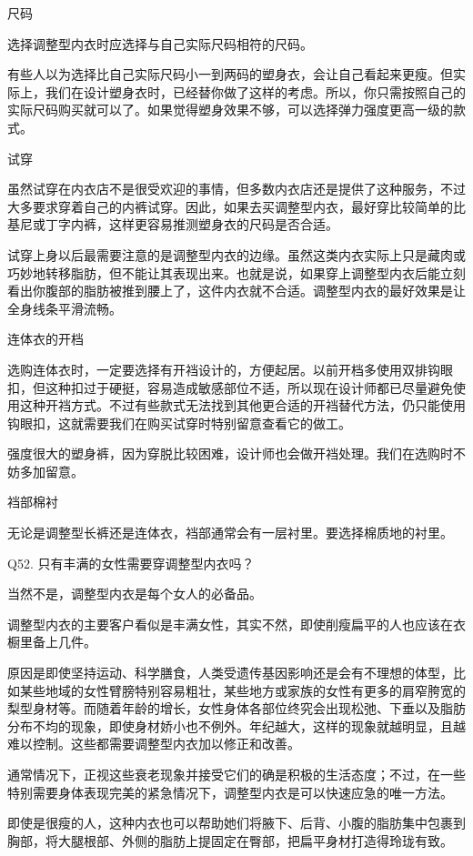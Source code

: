 \documentclass[12pt,UTF8]{ctexbook}
\begin{document}
尺码

选择调整型内衣时应选择与自己实际尺码相符的尺码。

有些人以为选择比自己实际尺码小一到两码的塑身衣，会让自己看起来更瘦。但实际上，我们在设计塑身衣时，已经替你做了这样的考虑。所以，你只需按照自己的实际尺码购买就可以了。如果觉得塑身效果不够，可以选择弹力强度更高一级的款式。

试穿

虽然试穿在内衣店不是很受欢迎的事情，但多数内衣店还是提供了这种服务，不过大多要求穿着自己的内裤试穿。因此，如果去买调整型内衣，最好穿比较简单的比基尼或丁字内裤，这样更容易推测塑身衣的尺码是否合适。

试穿上身以后最需要注意的是调整型内衣的边缘。虽然这类内衣实际上只是藏肉或巧妙地转移脂肪，但不能让其表现出来。也就是说，如果穿上调整型内衣后能立刻看出你腹部的脂肪被推到腰上了，这件内衣就不合适。调整型内衣的最好效果是让全身线条平滑流畅。

连体衣的开档

选购连体衣时，一定要选择有开裆设计的，方便起居。以前开档多使用双排钩眼扣，但这种扣过于硬挺，容易造成敏感部位不适，所以现在设计师都已尽量避免使用这种开裆方式。不过有些款式无法找到其他更合适的开裆替代方法，仍只能使用钩眼扣，这就需要我们在购买试穿时特别留意查看它的做工。

强度很大的塑身裤，因为穿脱比较困难，设计师也会做开裆处理。我们在选购时不妨多加留意。

裆部棉衬

无论是调整型长裤还是连体衣，裆部通常会有一层衬里。要选择棉质地的衬里。





Q52. 只有丰满的女性需要穿调整型内衣吗？


当然不是，调整型内衣是每个女人的必备品。

调整型内衣的主要客户看似是丰满女性，其实不然，即使削瘦扁平的人也应该在衣橱里备上几件。

原因是即使坚持运动、科学膳食，人类受遗传基因影响还是会有不理想的体型，比如某些地域的女性臂膀特别容易粗壮，某些地方或家族的女性有更多的肩窄胯宽的梨型身材等。而随着年龄的增长，女性身体各部位终究会出现松弛、下垂以及脂肪分布不均的现象，即使身材娇小也不例外。年纪越大，这样的现象就越明显，且越难以控制。这些都需要调整型内衣加以修正和改善。

通常情况下，正视这些衰老现象并接受它们的确是积极的生活态度；不过，在一些特别需要身体表现完美的紧急情况下，调整型内衣是可以快速应急的唯一方法。

即使是很瘦的人，这种内衣也可以帮助她们将腋下、后背、小腹的脂肪集中包裹到胸部，将大腿根部、外侧的脂肪上提固定在臀部，把扁平身材打造得玲珑有致。
\end{document}
